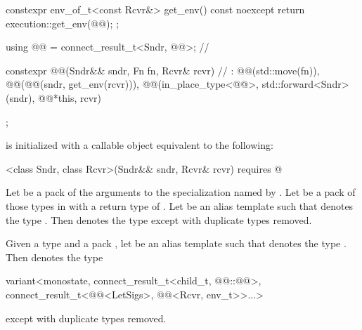 \begin{codeblock}
{{    constexpr env_of_t<const Rcvr&> get_env() const noexcept {
      return execution::get_env(@@);
    }
  };

  using @@ = connect_result_t<Sndr, @@>;                                // \expos

  constexpr @@(Sndr&& sndr, Fn fn, Rcvr& rcvr)                           // \expos
    : @@(std::move(fn)), @@(@@(sndr, get_env(rcvr))),
      @@(in_place_type<@@>, std::forward<Sndr>(sndr), @@{*this, rcvr}) {}
};
\end{codeblock}

\pnum
{}
is initialized with a callable object equivalent to the following:
\begin{codeblock}
[]<class Sndr, class Rcvr>(Sndr&& sndr, Rcvr& rcvr) requires @
\end{codeblock}

\pnum
Let  be a pack of the arguments
to the  specialization named by
.
Let  be a pack of those types in 
with a return type of .
Let  be an alias template
such that  denotes
the type .
Then  denotes
the type 
except with duplicate types removed.

\pnum
Given a type  and a pack ,
let  be an alias template
such that  denotes
the type .
Then  denotes
the type
\begin{codeblock}
variant<monostate,
        connect_result_t<child_t, @@::@@>,
        connect_result_t<@@<LetSigs>, @@<Rcvr, env_t>>...>
\end{codeblock}
except with duplicate types removed.


